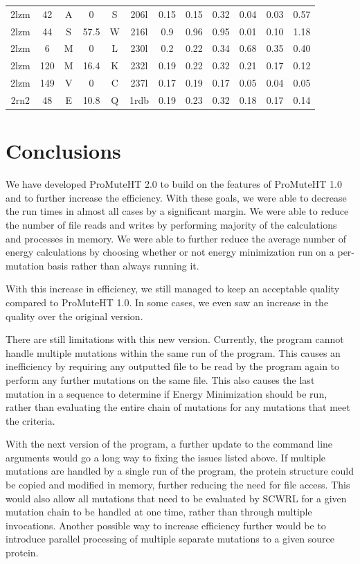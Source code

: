 \documentclass[sigconf]{acmart}
\begin{document}
\begin{table}[h]
{\begin{tabular}{|c|c c c|c c|c|c|c|c|c|c|}
		2lzm & 42 & A & 0 & S & 206l & 0.15 & 0.15 & 0.32 & 0.04 & 0.03 & 0.57 \\
		2lzm & 44 & S & 57.5 & W & 216l & 0.9 & 0.96 & 0.95 & 0.01 & 0.10 & 1.18 \\
		2lzm & 6 & M & 0 & L & 230l & 0.2 & 0.22 & 0.34 & 0.68 & 0.35 & 0.40 \\
		2lzm & 120 & M & 16.4 & K & 232l & 0.19 & 0.22 & 0.32 & 0.21 & 0.17 & 0.12 \\
		2lzm & 149 & V & 0 & C & 237l & 0.17 & 0.19 & 0.17 & 0.05 & 0.04 & 0.05 \\
		2rn2 & 48 & E & 10.8 & Q & 1rdb & 0.19 & 0.23 & 0.32 & 0.18 & 0.17 & 0.14 \\
		\hline
	\end{tabular}}
\end{table}

\section{Conclusions}
We have developed ProMuteHT 2.0 to build on the features of ProMuteHT 1.0  and to further increase the efficiency.  With these goals, we were able to decrease the run times in almost all cases by a significant margin.  We were able to reduce the number of file reads and writes by performing majority of the calculations and processes in memory.  We were able to further reduce the average number of energy calculations by choosing whether or not energy minimization run on a per-mutation basis rather than always running it.

With this increase in efficiency, we still managed to keep an acceptable quality compared to ProMuteHT 1.0. In some cases, we even saw an increase in the quality over the original version.

There are still limitations with this new version.  Currently, the program cannot handle multiple mutations within the same run of the program.  This causes an inefficiency by requiring any outputted file to be read by the program again to perform any further mutations on the same file.  This also causes the last mutation in a sequence to determine if Energy Minimization should be run, rather than evaluating the entire chain of mutations for any mutations that meet the criteria.

With the next version of the program, a further update to the command line arguments would go a long way to fixing the issues listed above.  If multiple mutations are handled by a single run of the program, the protein structure could be copied and modified in memory, further reducing the need for file access.  This would also allow all mutations that need to be evaluated by SCWRL for a given mutation chain to be handled at one time, rather than through multiple invocations. Another possible way to increase efficiency further would be to introduce parallel processing of multiple separate mutations to a given source protein.
\end{document}
